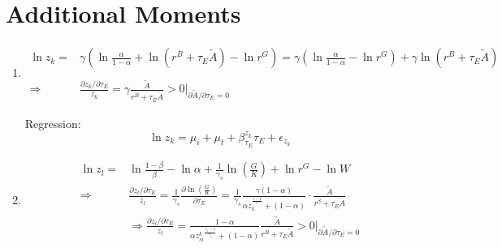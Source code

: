 \documentclass[12pt]{article} %
\begin{document}
\section*{Additional Moments}
\begin{enumerate}
    \item 
    \begin{equation*}
        \begin{split}
            \ln z_k =& {\gamma} (
            \ln \frac{\alpha}{1-\alpha} + \ln ({r^B + \tau_E\tilde{A}}) - \ln {r^G} ) =  {\gamma} (\ln \frac{\alpha}{1-\alpha} - \ln {r^G}) + {\gamma} \ln ({r^B + \tau_E\tilde{A}})\\
            \\
            \Rightarrow & \frac{\partial z_k/\partial \tau_E }{z_k} = {\gamma} \frac{\tilde{A}}{r^B + \tau_E\tilde{A}}>0\left.\Bigg|_{\partial \tilde{A} /\partial \tau_E = 0}\right.
        \end{split}
    \end{equation*}

    Regression:
    \begin{equation*}
        \ln z_k = \mu_i + \mu_t + \beta_{\tau_E}^{z_k} \tau_E + \epsilon_{z_k}
    \end{equation*}



    \item 
    \begin{equation*}
        \begin{split}
            \ln z_l =& \ln \frac{1-\beta}{\beta} - \ln {\alpha} +\frac{1}{\gamma_s} \ln (\frac{G}{K}) + \ln r^G - \ln W\\
            \Rightarrow & \frac{\partial z_l/\partial \tau_E }{z_l} = \frac{1}{\gamma_s} \frac{\partial \ln (\frac{G}{K}) }{ \partial \tau_E}  =  \frac{1}{\gamma_s}\frac{\gamma(1-\alpha)}{\alpha z_k^{\frac{\gamma-1}{\gamma}}+(1-\alpha)} \cdot \frac{\tilde{A}}{r^\beta+\tau_E \tilde{A}} \\
            & 
            \Rightarrow \frac{\partial z_l/\partial \tau_E }{z_l} = \frac{1-\alpha}{{\alpha z^k_{si}}^{\frac{\gamma_s-1}{\gamma_s}} + (1-\alpha)}\frac{\tilde{A}}{r^B + \tau_E\tilde{A}} >0\left.\Bigg|_{\partial \tilde{A} /\partial \tau_E = 0}\right.
        \end{split}
    \end{equation*}



\end{enumerate}
\end{document}

